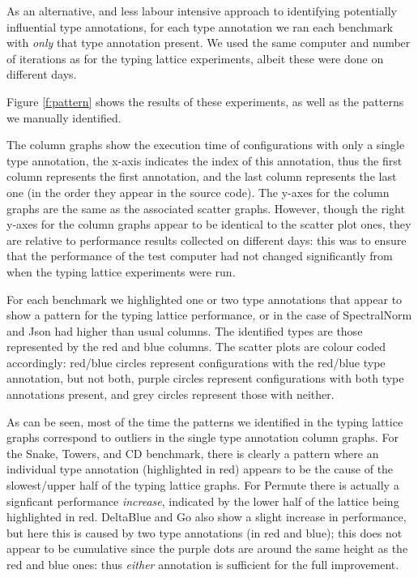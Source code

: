 \documentclass[sigplan,10pt,review,screen]{acmart}\settopmatter{printfolios=true}
\begin{document}
As an alternative, and less labour intensive approach to identifying potentially influential type annotations, for each type annotation we ran each benchmark with \textit{only} that type annotation present. We used the same computer and number of iterations as for the typing lattice experiments, albeit these were done on different days.

Figure \ref{f:pattern} shows the results of these experiments, as well as the patterns we manually identified.

The column graphs show the execution time of configurations with only a single type annotation, the x-axis indicates the index of this annotation, thus the first column represents the first annotation, and the last column represents the last one (in the order they appear in the source code). The y-axes for the column graphs are the same as the associated scatter graphs. However, though the right y-axes for the column graphs appear to be identical to the scatter plot ones, they are relative to performance results collected on different days: this was to ensure that the performance of the test computer had not changed significantly from when the typing lattice experiments were run.

For each benchmark we highlighted one or two type annotations that appear to show a pattern for the typing lattice performance, or in the case of SpectralNorm and Json had higher than usual columns. The identified types are those represented by the red and blue columns. The scatter plots are colour coded accordingly: red/blue circles represent configurations with the red/blue type annotation, but not both, purple circles represent configurations with both type annotations present, and grey circles represent those with neither.

As can be seen, most of the time the patterns we identified in the typing lattice graphs correspond to outliers in the single type annotation column graphs. For the Snake, Towers, and CD benchmark, there is clearly a pattern where an individual type annotation (highlighted in red) appears to be the cause of the slowest/upper half of the typing lattice graphs. For Permute there is actually a signficant performance \emph{increase}, indicated by the lower half of the lattice being highlighted in red. DeltaBlue and Go also show a slight increase in performance, but here this is caused by two type annotations (in red and blue); this does not appear to be cumulative since the purple dots are around the same height as the red and blue ones: thus \textit{either} annotation is sufficient for the full improvement.
\end{document}
